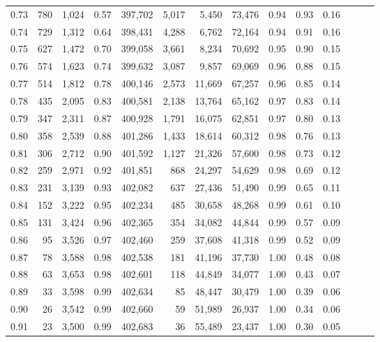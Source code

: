 \begin{tabular}{rrrrrrrrrrrrrr}
0.73 &    780 &  1,024 &  0.57 &  397,702 &    5,017 &   5,450 &  73,476 &  0.94 &  0.93 &      0.16 \\
0.74 &    729 &  1,312 &  0.64 &  398,431 &    4,288 &   6,762 &  72,164 &  0.94 &  0.91 &      0.16 \\
0.75 &    627 &  1,472 &  0.70 &  399,058 &    3,661 &   8,234 &  70,692 &  0.95 &  0.90 &      0.15 \\
0.76 &    574 &  1,623 &  0.74 &  399,632 &    3,087 &   9,857 &  69,069 &  0.96 &  0.88 &      0.15 \\
0.77 &    514 &  1,812 &  0.78 &  400,146 &    2,573 &  11,669 &  67,257 &  0.96 &  0.85 &      0.14 \\
0.78 &    435 &  2,095 &  0.83 &  400,581 &    2,138 &  13,764 &  65,162 &  0.97 &  0.83 &      0.14 \\
0.79 &    347 &  2,311 &  0.87 &  400,928 &    1,791 &  16,075 &  62,851 &  0.97 &  0.80 &      0.13 \\
0.80 &    358 &  2,539 &  0.88 &  401,286 &    1,433 &  18,614 &  60,312 &  0.98 &  0.76 &      0.13 \\
0.81 &    306 &  2,712 &  0.90 &  401,592 &    1,127 &  21,326 &  57,600 &  0.98 &  0.73 &      0.12 \\
0.82 &    259 &  2,971 &  0.92 &  401,851 &      868 &  24,297 &  54,629 &  0.98 &  0.69 &      0.12 \\
0.83 &    231 &  3,139 &  0.93 &  402,082 &      637 &  27,436 &  51,490 &  0.99 &  0.65 &      0.11 \\
0.84 &    152 &  3,222 &  0.95 &  402,234 &      485 &  30,658 &  48,268 &  0.99 &  0.61 &      0.10 \\
0.85 &    131 &  3,424 &  0.96 &  402,365 &      354 &  34,082 &  44,844 &  0.99 &  0.57 &      0.09 \\
0.86 &     95 &  3,526 &  0.97 &  402,460 &      259 &  37,608 &  41,318 &  0.99 &  0.52 &      0.09 \\
0.87 &     78 &  3,588 &  0.98 &  402,538 &      181 &  41,196 &  37,730 &  1.00 &  0.48 &      0.08 \\
0.88 &     63 &  3,653 &  0.98 &  402,601 &      118 &  44,849 &  34,077 &  1.00 &  0.43 &      0.07 \\
0.89 &     33 &  3,598 &  0.99 &  402,634 &       85 &  48,447 &  30,479 &  1.00 &  0.39 &      0.06 \\
0.90 &     26 &  3,542 &  0.99 &  402,660 &       59 &  51,989 &  26,937 &  1.00 &  0.34 &      0.06 \\
0.91 &     23 &  3,500 &  0.99 &  402,683 &       36 &  55,489 &  23,437 &  1.00 &  0.30 &      0.05 \\

\end{tabular}

